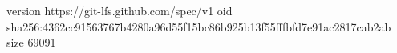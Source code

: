 version https://git-lfs.github.com/spec/v1
oid sha256:4362cc91563767b4280a96d55f15bc86b925b13f55fffbfd7e91ac2817cab2ab
size 69091
